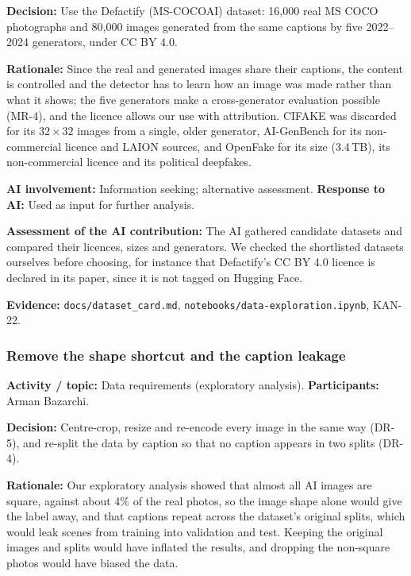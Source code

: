 \documentclass[11pt]{article}
\begin{document}
\noindent\textbf{Decision:} Use the Defactify (MS-COCOAI) dataset: 16{,}000 real MS COCO photographs and 80{,}000 images generated from the same captions by five 2022--2024 generators, under CC BY 4.0.

\noindent\textbf{Rationale:} Since the real and generated images share their captions, the content is controlled and the detector has to learn how an image was made rather than what it shows; the five generators make a cross-generator evaluation possible (MR-4), and the licence allows our use with attribution. CIFAKE was discarded for its $32\times32$ images from a single, older generator, AI-GenBench for its non-commercial licence and LAION sources, and OpenFake for its size (3.4\,TB), its non-commercial licence and its political deepfakes.

\noindent\textbf{AI involvement:} Information seeking; alternative assessment. \textbf{Response to AI:} Used as input for further analysis.

\noindent\textbf{Assessment of the AI contribution:} The AI gathered candidate datasets and compared their licences, sizes and generators. We checked the shortlisted datasets ourselves before choosing, for instance that Defactify's CC BY 4.0 licence is declared in its paper, since it is not tagged on Hugging Face.

\noindent\textbf{Evidence:} \texttt{docs/dataset\_card.md}, \texttt{notebooks/data-exploration.ipynb}, KAN-22.

\subsubsection{Remove the shape shortcut and the caption leakage}
\noindent\textbf{Activity / topic:} Data requirements (exploratory analysis). \textbf{Participants:} Arman Bazarchi.

\noindent\textbf{Decision:} Centre-crop, resize and re-encode every image in the same way (DR-5), and re-split the data by caption so that no caption appears in two splits (DR-4).

\noindent\textbf{Rationale:} Our exploratory analysis showed that almost all AI images are square, against about 4\% of the real photos, so the image shape alone would give the label away, and that captions repeat across the dataset's original splits, which would leak scenes from training into validation and test. Keeping the original images and splits would have inflated the results, and dropping the non-square photos would have biased the data.
\end{document}
